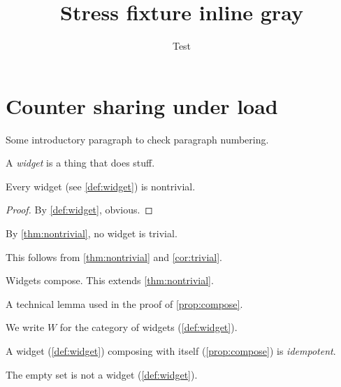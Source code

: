 \documentclass{article}
\title{Stress fixture inline gray}
\author{Test}
\date{}
\begin{document}
\START
\maketitle

\section{Counter sharing under load}

Some introductory paragraph to check paragraph numbering.

\begin{definition}\label{def:widget}
A \emph{widget} is a thing that does stuff.
\end{definition}

\begin{theorem}\label{thm:nontrivial}
Every widget (see \cref{def:widget}) is nontrivial.
\end{theorem}

\begin{proof}
By \cref{def:widget}, obvious.
\end{proof}

\begin{corollary}\label{cor:trivial}
By \cref{thm:nontrivial}, no widget is trivial.
\end{corollary}

\begin{remark}\label{rem:note}
This follows from \cref{thm:nontrivial} and \cref{cor:trivial}.
\end{remark}

\begin{proposition}\label{prop:compose}
Widgets compose. This extends \cref{thm:nontrivial}.
\end{proposition}

\begin{lemma}\label{lem:technical}
A technical lemma used in the proof of \cref{prop:compose}.
\end{lemma}

\begin{notation}\label{not:W}
We write $W$ for the category of widgets (\cref{def:widget}).
\end{notation}

\begin{terminology}\label{term:idempotent}
A widget (\cref{def:widget}) composing with itself (\cref{prop:compose}) is \emph{idempotent}.
\end{terminology}

\begin{example}\label{ex:empty}
The empty set is not a widget (\cref{def:widget}).
\end{example}
\end{document}
